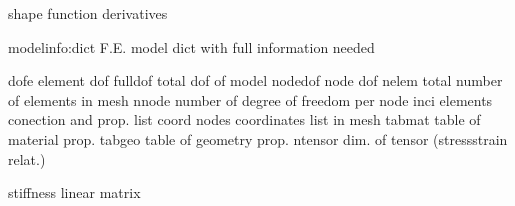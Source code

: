 \documentclass[letterpaper,10pt,english]{sphinxmanual}
\begin{document}
\begin{fulllineitems}
\begin{fulllineitems}
\label{\detokenize{myfempy.felib.struct:myfempy.felib.struct.plane31.Plane31.matriz_b}}
\pysigstartsignatures
{}
\pysigstopsignatures
\sphinxAtStartPar
shape function derivatives

\end{fulllineitems}


\begin{fulllineitems}
\label{\detokenize{myfempy.felib.struct:myfempy.felib.struct.plane31.Plane31.ntensor}}
\pysigstartsignatures
{}
\pysigstopsignatures\begin{description}
\sphinxAtStartPar
modelinfo:dict     \textendash{} F.E. model dict with full information needed

\sphinxAtStartPar
dofe              \textendash{} element dof
fulldof           \textendash{} total dof of model
nodedof           \textendash{} node dof 
nelem             \textendash{} total number of elements in mesh
nnode             \textendash{} number of degree of freedom per node
inci              \textendash{} elements conection and prop. list
coord             \textendash{} nodes coordinates list in mesh
tabmat            \textendash{} table of material prop.
tabgeo            \textendash{} table of geometry prop.
ntensor           \textendash{} dim. of tensor (stress\sphinxhyphen{}strain relat.)

\end{description}

\end{fulllineitems}


\begin{fulllineitems}
\label{\detokenize{myfempy.felib.struct:myfempy.felib.struct.plane31.Plane31.stiff_linear}}
\pysigstartsignatures
{}
\pysigstopsignatures
\sphinxAtStartPar
stiffness linear matrix

\end{fulllineitems}


\end{fulllineitems}
\end{document}
